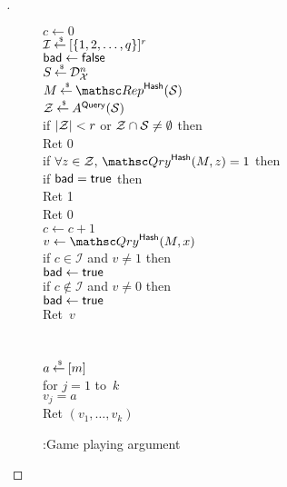 \begin{proof}[]
\begin{figure}
{{$c \gets 0$\\
$\mathcal{I}{\:\stackrel{{\scriptscriptstyle \hspace{0.2em}\$}} {\leftarrow}\:} [\{1,2,\ldots,q\}]^r$\\
$\mathsf{bad} \gets \mathsf{false}$\\
$S {\:\stackrel{{\scriptscriptstyle \hspace{0.2em}\$}} {\leftarrow}\:} \mathcal{D}_{{\cal X}}^{n}$\\
$M \getsr \Rep^{\HashOracle}(\calS)$\\
${\cal Z} {\:\stackrel{{\scriptscriptstyle \hspace{0.2em}\$}} {\leftarrow}\:} A^{\mathsf{Query}}({\cal S})$\\
if $|{\cal Z}| < r$ or ${\cal Z} \cap {\cal S} \neq \emptyset$ then\\
\nudge Ret 0\\
if $\forall z \in \calZ,\,\Qry^{\HashOracle}(M,z)=1$ then \\
\nudge if $\mathsf{bad}=\mathsf{true}$ then \\
\nudge Ret 1\\
Ret 0
}
{
\\
$c \gets c+1$\\
$v \gets \Qry^{\HashOracle}(M,x)$\\
if $c \in \mathcal{I}$ and $v\neq 1$ then\\
\nudge $\mathsf{bad} \gets \mathsf{true}$ \\
if $c \not\in \mathcal{I}$ and $v\neq 0$ then\\
\nudge $\mathsf{bad} \gets \mathsf{true}$\\
Ret~$v$\\\\
%
\\
$a {\:\stackrel{{\scriptscriptstyle \hspace{0.2em}\$}} {\leftarrow}\:} [m]$\\
for $j = 1$ to~$k$\\
\nudge $v_j = a$\\
Ret $\left(v_1,\ldots,v_k\right)$
}
}
\caption{:Game playing argument}\label{fig:Game}
\end{figure}


\end{proof}
